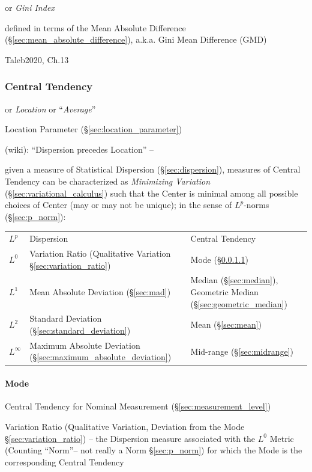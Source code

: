 or \emph{Gini Index}

defined in terms of the Mean Absolute Difference
(\S\ref{sec:mean_absolute_difference}), a.k.a. Gini Mean Difference (GMD)

Taleb2020, Ch.13



\subsubsection{Central Tendency}\label{sec:central_tendency}

or \emph{Location} or ``\emph{Average}''

\fist Location Parameter (\S\ref{sec:location_parameter})

(wiki): ``Dispersion precedes Location'' --

given a measure of Statistical Dispersion (\S\ref{sec:dispersion}), measures of
Central Tendency can be characterized as \emph{Minimizing Variation}
(\S\ref{sec:variational_calculus}) such that the Center is minimal among all
possible choices of Center (may or may not be unique); in the sense of
$L^p$-norms (\S\ref{sec:p_norm}):
\begin{tabular}{l l l}
  $L^p$ & Dispersion & Central Tendency \\
  $L^0$ & Variation Ratio (Qualitative Variation \S\ref{sec:variation_ratio})
    & Mode (\S\ref{sec:mode}) \\
  $L^1$ & Mean Absolute Deviation (\S\ref{sec:mad})
    & Median (\S\ref{sec:median}),
      Geometric Median (\S\ref{sec:geometric_median}) \\
  $L^2$ & Standard Deviation (\S\ref{sec:standard_deviation})
    & Mean (\S\ref{sec:mean}) \\
  $L^\infty$
    & Maximum Absolute Deviation (\S\ref{sec:maximum_absolute_deviation})
    & Mid-range (\S\ref{sec:midrange})
\end{tabular}



\paragraph{Mode}\label{sec:mode}\hfill

Central Tendency for Nominal Measurement (\S\ref{sec:measurement_level})

\fist Variation Ratio (Qualitative Variation, Deviation from the Mode
\S\ref{sec:variation_ratio}) -- the Dispersion measure associated with the $L^0$
Metric (Counting ``Norm''-- not really a Norm \S\ref{sec:p_norm}) for which the
Mode is the corresponding Central Tendency


